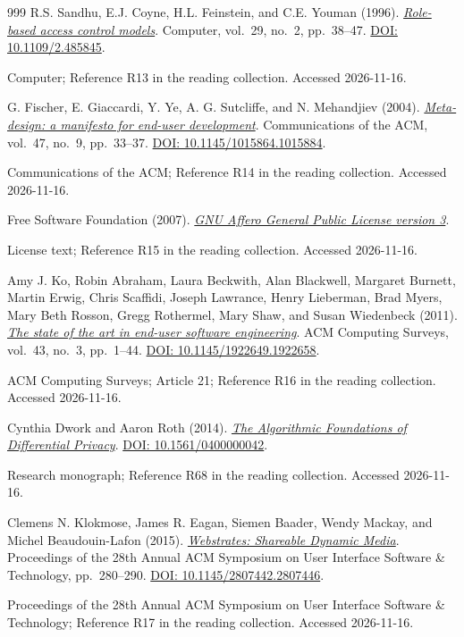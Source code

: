 \documentclass[11pt,letterpaper]{article}
\begin{document}
\begin{thebibliography}{999}
R.S. Sandhu, E.J. Coyne, H.L. Feinstein, and C.E. Youman (1996).
\href{https://doi.org/10.1109/2.485845}{\emph{Role-based access control models}}.
Computer, vol.~29, no.~2, pp.~38--47.
\href{https://doi.org/10.1109/2.485845}{DOI: 10.1109/2.485845}.
\par {\small Computer; Reference R13 in the reading collection.}
{\small Accessed 2026-11-16.}

G. Fischer, E. Giaccardi, Y. Ye, A. G. Sutcliffe, and N. Mehandjiev (2004).
\href{https://doi.org/10.1145/1015864.1015884}{\emph{Meta-design: a manifesto for end-user development}}.
Communications of the ACM, vol.~47, no.~9, pp.~33--37.
\href{https://doi.org/10.1145/1015864.1015884}{DOI: 10.1145/1015864.1015884}.
\par {\small Communications of the ACM; Reference R14 in the reading collection.}
{\small Accessed 2026-11-16.}

Free Software Foundation (2007).
\href{https://opensource.org/license/agpl-3-0}{\emph{GNU Affero General Public License version 3}}.
\par {\small License text; Reference R15 in the reading collection.}
{\small Accessed 2026-11-16.}

Amy J. Ko, Robin Abraham, Laura Beckwith, Alan Blackwell, Margaret Burnett, Martin Erwig, Chris Scaffidi, Joseph Lawrance, Henry Lieberman, Brad Myers, Mary Beth Rosson, Gregg Rothermel, Mary Shaw, and Susan Wiedenbeck (2011).
\href{https://doi.org/10.1145/1922649.1922658}{\emph{The state of the art in end-user software engineering}}.
ACM Computing Surveys, vol.~43, no.~3, pp.~1--44.
\href{https://doi.org/10.1145/1922649.1922658}{DOI: 10.1145/1922649.1922658}.
\par {\small ACM Computing Surveys; Article 21; Reference R16 in the reading collection.}
{\small Accessed 2026-11-16.}

Cynthia Dwork and Aaron Roth (2014).
\href{https://www.cis.upenn.edu/~aaroth/privacybook.html}{\emph{The Algorithmic Foundations of Differential Privacy}}.
\href{https://doi.org/10.1561/0400000042}{DOI: 10.1561/0400000042}.
\par {\small Research monograph; Reference R68 in the reading collection.}
{\small Accessed 2026-11-16.}

Clemens N. Klokmose, James R. Eagan, Siemen Baader, Wendy Mackay, and Michel Beaudouin-Lafon (2015).
\href{https://doi.org/10.1145/2807442.2807446}{\emph{Webstrates: Shareable Dynamic Media}}.
Proceedings of the 28th Annual ACM Symposium on User Interface Software \& Technology, pp.~280--290.
\href{https://doi.org/10.1145/2807442.2807446}{DOI: 10.1145/2807442.2807446}.
\par {\small Proceedings of the 28th Annual ACM Symposium on User Interface Software \& Technology; Reference R17 in the reading collection.}
{\small Accessed 2026-11-16.}


\end{thebibliography}
\end{document}
